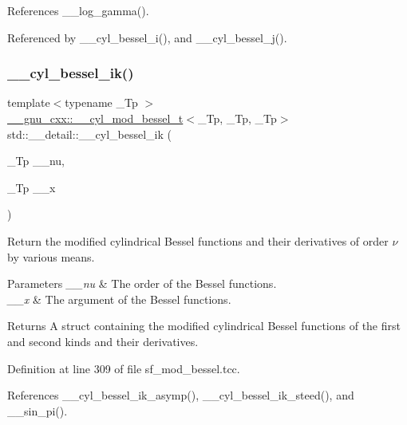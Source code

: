 References \+\_\+\+\_\+log\+\_\+gamma().



Referenced by \+\_\+\+\_\+cyl\+\_\+bessel\+\_\+i(), and \+\_\+\+\_\+cyl\+\_\+bessel\+\_\+j().

\mbox{\label{namespacestd_1_1____detail_a9ada6640e605fc21b12191e651e39de1}} 
\subsubsection{\texorpdfstring{\+\_\+\+\_\+cyl\+\_\+bessel\+\_\+ik()}{\_\_cyl\_bessel\_ik()}}
{\footnotesize\ttfamily template$<$typename \+\_\+\+Tp $>$ \\
\hyperlink{struct____gnu__cxx_1_1____cyl__mod__bessel__t}{\+\_\+\+\_\+gnu\+\_\+cxx\+::\+\_\+\+\_\+cyl\+\_\+mod\+\_\+bessel\+\_\+t}$<$\+\_\+\+Tp, \+\_\+\+Tp, \+\_\+\+Tp$>$ std\+::\+\_\+\+\_\+detail\+::\+\_\+\+\_\+cyl\+\_\+bessel\+\_\+ik (\begin{DoxyParamCaption}\item[{\+\_\+\+Tp}]{\+\_\+\+\_\+nu,  }\item[{\+\_\+\+Tp}]{\+\_\+\+\_\+x }\end{DoxyParamCaption})}



Return the modified cylindrical Bessel functions and their derivatives of order $ \nu $ by various means. 


\begin{DoxyParams}{Parameters}
{\em \+\_\+\+\_\+nu} & The order of the Bessel functions. \\
\hline
{\em \+\_\+\+\_\+x} & The argument of the Bessel functions. \\
\hline
\end{DoxyParams}
\begin{DoxyReturn}{Returns}
A struct containing the modified cylindrical Bessel functions of the first and second kinds and their derivatives. 
\end{DoxyReturn}


Definition at line 309 of file sf\+\_\+mod\+\_\+bessel.\+tcc.



References \+\_\+\+\_\+cyl\+\_\+bessel\+\_\+ik\+\_\+asymp(), \+\_\+\+\_\+cyl\+\_\+bessel\+\_\+ik\+\_\+steed(), and \+\_\+\+\_\+sin\+\_\+pi().



